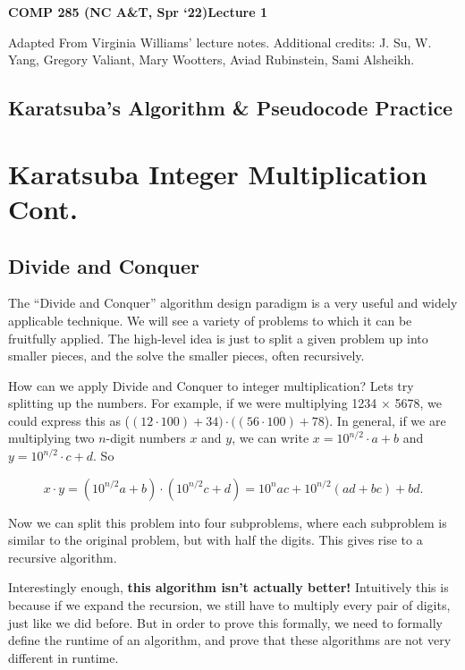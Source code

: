 \documentclass [12pt]{article}
\begin{document}
 

{\LARGE \textbf {COMP 285 (NC A\&T, Spr `22)}\hfill \textbf {Lecture 1} } 
\vspace {1em} 
\begin {Instruction} 

Adapted From Virginia Williams’ lecture notes. Additional credits: J. Su, W. Yang, Gregory Valiant, Mary Wootters, Aviad Rubinstein, Sami Alsheikh.
\end {Instruction} 

\begin{centering}
\section*{Karatsuba's Algorithm \& Pseudocode Practice}
\end{centering}

\section{Karatsuba Integer Multiplication Cont.}

\subsection{Divide and Conquer}

The ``Divide and Conquer'' algorithm design paradigm is a very useful and widely applicable technique. We will see a variety of problems to which it can be fruitfully applied. The high-level idea is just to split a given problem up into smaller pieces, and the solve the smaller pieces, often recursively.

How can we apply Divide and Conquer to integer multiplication? Lets try splitting up the numbers. For example, if we were multiplying 1234 × 5678, we could express this as ($(12 \cdot 100) + 34) \cdot ((56 \cdot 100) + 78$). In general, if we are multiplying two $n$-digit numbers $x$ and $y$, we can write $x = 10^{n/2} \cdot a + b$ and $y = 10^{n/2} \cdot c + d$. So

$$
x \cdot y = (10^{n/2}a + b) \cdot (10^{n/2}c + d) = 10^nac + 10^{n/2}(ad + bc) + bd.
$$

Now we can split this problem into four subproblems, where each subproblem is similar to the
original problem, but with half the digits. This gives rise to a recursive algorithm.

Interestingly enough, \textbf{this algorithm isn’t actually better!} Intuitively this is because if we
expand the recursion, we still have to multiply every pair of digits, just like we did before. But
in order to prove this formally, we need to formally define the runtime of an algorithm, and
prove that these algorithms are not very different in runtime.
\end{document}
